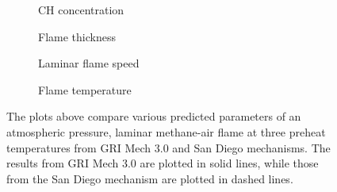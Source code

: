 \begin{figure}

\hfill
\begin{subfigure}{0.45\linewidth}
  \centering
  
  \caption{CH concentration}
  \label{fig:gri-sd-xch}
\end{subfigure}
\hfill
\begin{subfigure}{0.45\linewidth}
  \centering
  
  \caption{Flame thickness}
  \label{fig:gri-sd-delxf}
\end{subfigure}
\hfill

\hfill
\begin{subfigure}{0.45\linewidth}
  \centering
  
  \caption{Laminar flame speed}
  \label{fig:gri-sd-sl}
\end{subfigure}
\hfill
\begin{subfigure}{0.45\linewidth}
  \centering
  
  \caption{Flame temperature}
  \label{fig:gri-sd-t}
\end{subfigure}
\hfill

\caption[Comparison of GRI Mech 3.0 and San Diego mechanisms]{The plots above compare various predicted parameters of an atmospheric pressure, laminar methane-air flame at three preheat temperatures from GRI Mech 3.0 and San Diego mechanisms. The results from GRI Mech 3.0 are plotted in solid lines, while those from the San Diego mechanism are plotted in dashed lines.}

\label{fig:gri-sd}

\end{figure}
